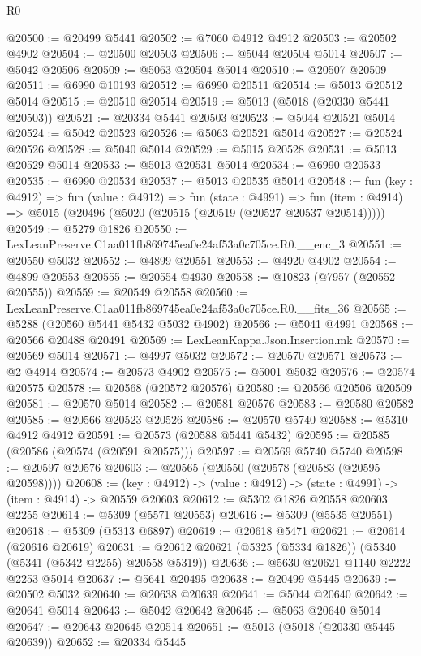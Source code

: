 \begin{lexlean}{R0}
\begin{coremodule}
@20500 := @20499 @5441
@20502 := @7060 @4912 @4912
@20503 := @20502 @4902
@20504 := @20500 @20503
@20506 := @5044 @20504 @5014
@20507 := @5042 @20506
@20509 := @5063 @20504 @5014
@20510 := @20507 @20509
@20511 := @6990 @10193
@20512 := @6990 @20511
@20514 := @5013 @20512 @5014
@20515 := @20510 @20514
@20519 := @5013 (@5018 (@20330 @5441 @20503))
@20521 := @20334 @5441 @20503
@20523 := @5044 @20521 @5014
@20524 := @5042 @20523
@20526 := @5063 @20521 @5014
@20527 := @20524 @20526
@20528 := @5040 @5014
@20529 := @5015 @20528
@20531 := @5013 @20529 @5014
@20533 := @5013 @20531 @5014
@20534 := @6990 @20533
@20535 := @6990 @20534
@20537 := @5013 @20535 @5014
@20548 := fun (key : @4912) =>
  fun (value : @4912) =>
  fun (state : @4991) =>
  fun (item : @4914) => @5015 (@20496 (@5020 (@20515 (@20519 (@20527 @20537 @20514)))))
@20549 := @5279 @1826
@20550 := LexLeanPreserve.C1aa011fb869745ea0e24af53a0c705ce.R0.__enc_3
@20551 := @20550 @5032
@20552 := @4899 @20551
@20553 := @4920 @4902
@20554 := @4899 @20553
@20555 := @20554 @4930
@20558 := @10823 (@7957 (@20552 @20555))
@20559 := @20549 @20558
@20560 := LexLeanPreserve.C1aa011fb869745ea0e24af53a0c705ce.R0.__fits_36
@20565 := @5288 (@20560 @5441 @5432 @5032 @4902)
@20566 := @5041 @4991
@20568 := @20566 @20488 @20491
@20569 := LexLeanKappa.Json.Insertion.mk
@20570 := @20569 @5014
@20571 := @4997 @5032
@20572 := @20570 @20571
@20573 := @2 @4914
@20574 := @20573 @4902
@20575 := @5001 @5032
@20576 := @20574 @20575
@20578 := @20568 (@20572 @20576)
@20580 := @20566 @20506 @20509
@20581 := @20570 @5014
@20582 := @20581 @20576
@20583 := @20580 @20582
@20585 := @20566 @20523 @20526
@20586 := @20570 @5740
@20588 := @5310 @4912 @4912
@20591 := @20573 (@20588 @5441 @5432)
@20595 := @20585 (@20586 (@20574 (@20591 @20575)))
@20597 := @20569 @5740 @5740
@20598 := @20597 @20576
@20603 := @20565 (@20550 (@20578 (@20583 (@20595 @20598))))
@20608 := (key : @4912) -> (value : @4912) -> (state : @4991) -> (item : @4914) -> @20559 @20603
@20612 := @5302 @1826 @20558 @20603 @2255
@20614 := @5309 (@5571 @20553)
@20616 := @5309 (@5535 @20551)
@20618 := @5309 (@5313 @6897)
@20619 := @20618 @5471
@20621 := @20614 (@20616 @20619)
@20631 := @20612 @20621 (@5325 (@5334 @1826)) (@5340 (@5341 (@5342 @2255) @20558 @5319))
@20636 := @5630 @20621 @1140 @2222 @2253 @5014
@20637 := @5641 @20495
@20638 := @20499 @5445
@20639 := @20502 @5032
@20640 := @20638 @20639
@20641 := @5044 @20640
@20642 := @20641 @5014
@20643 := @5042 @20642
@20645 := @5063 @20640 @5014
@20647 := @20643 @20645 @20514
@20651 := @5013 (@5018 (@20330 @5445 @20639))
@20652 := @20334 @5445

\end{coremodule}
\end{lexlean}
